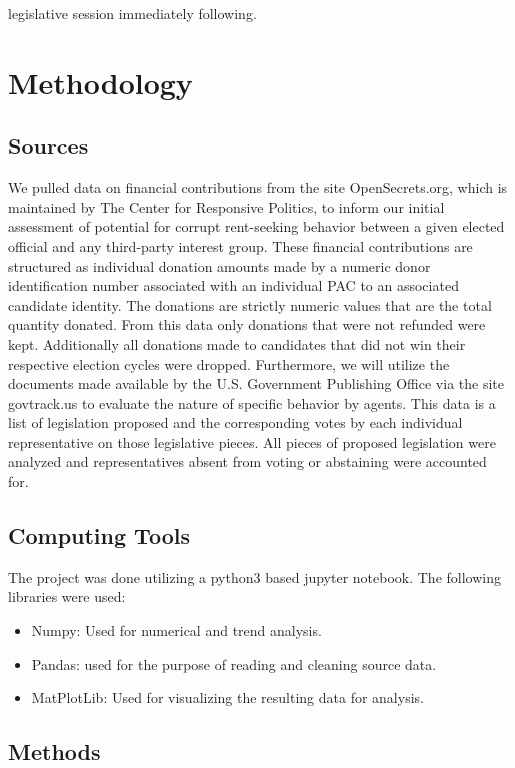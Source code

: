 \documentclass[journal]{IEEEtran}
\begin{document}
legislative session immediately following.
\section{Methodology}
\subsection{Sources}
We pulled data on financial contributions from the site OpenSecrets.org, which is maintained by The Center for Responsive Politics, 
to inform our initial assessment of potential for corrupt rent-seeking behavior between a given elected official and any third-party 
interest group. These financial contributions are structured as individual donation amounts made by a numeric donor identification 
number associated with an individual PAC to an associated candidate identity. The donations are strictly numeric values that are the 
total quantity donated. From this data only donations that were not refunded were kept. Additionally all donations made to candidates
that did not win their respective election cycles were dropped.
\newline
  Furthermore, we will utilize the documents made available by the U.S. Government Publishing Office via the site govtrack.us to 
evaluate the nature of specific behavior by agents. This data is a list of legislation proposed and the corresponding votes by each 
individual representative on those legislative pieces. All pieces of proposed legislation were analyzed and representatives absent 
from voting or abstaining were accounted for.

\subsection{Computing Tools}
The project was done utilizing a python3 based jupyter notebook. The following libraries were used:
\begin{itemize}
 \item Numpy: Used for numerical and trend analysis.
 \item Pandas: used for the purpose of reading and cleaning source data.
 \item MatPlotLib: Used for visualizing the resulting data for analysis.
\end{itemize}

\subsection{Methods}
\end{document}
